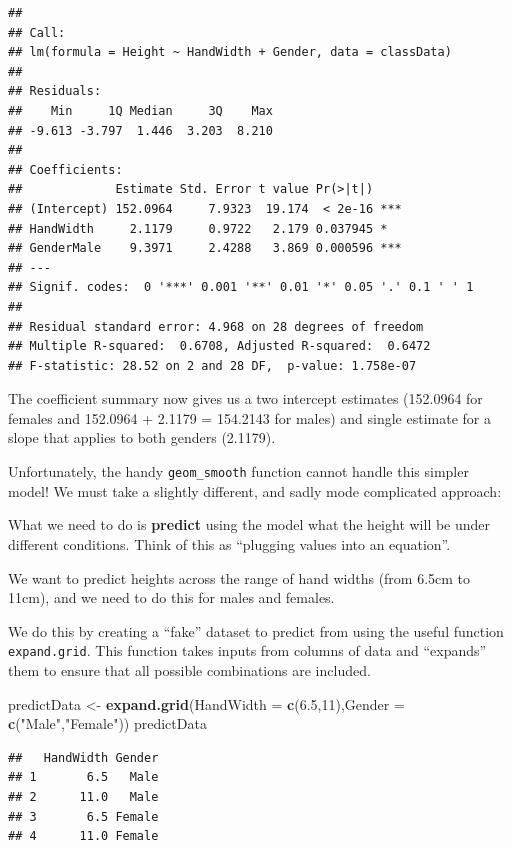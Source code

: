 \documentclass[
  a4paperpaper,
]{book}
\newenvironment{Shaded}{\begin{snugshade}}{\end{snugshade}}
\newcommand{\DataTypeTok}[1]{\textcolor[rgb]{0.13,0.29,0.53}{#1}}
\newcommand{\DecValTok}[1]{\textcolor[rgb]{0.00,0.00,0.81}{#1}}
\newcommand{\FloatTok}[1]{\textcolor[rgb]{0.00,0.00,0.81}{#1}}
\newcommand{\KeywordTok}[1]{\textcolor[rgb]{0.13,0.29,0.53}{\textbf{#1}}}
\newcommand{\NormalTok}[1]{#1}
\newcommand{\StringTok}[1]{\textcolor[rgb]{0.31,0.60,0.02}{#1}}
\begin{document}
\begin{verbatim}
## 
## Call:
## lm(formula = Height ~ HandWidth + Gender, data = classData)
## 
## Residuals:
##    Min     1Q Median     3Q    Max 
## -9.613 -3.797  1.446  3.203  8.210 
## 
## Coefficients:
##             Estimate Std. Error t value Pr(>|t|)    
## (Intercept) 152.0964     7.9323  19.174  < 2e-16 ***
## HandWidth     2.1179     0.9722   2.179 0.037945 *  
## GenderMale    9.3971     2.4288   3.869 0.000596 ***
## ---
## Signif. codes:  0 '***' 0.001 '**' 0.01 '*' 0.05 '.' 0.1 ' ' 1
## 
## Residual standard error: 4.968 on 28 degrees of freedom
## Multiple R-squared:  0.6708,	Adjusted R-squared:  0.6472 
## F-statistic: 28.52 on 2 and 28 DF,  p-value: 1.758e-07
\end{verbatim}

The coefficient summary now gives us a two intercept estimates (152.0964 for females and 152.0964 + 2.1179 = 154.2143 for males) and single estimate for a slope that applies to both genders (2.1179).

Unfortunately, the handy \texttt{geom\_smooth} function cannot handle this simpler model! We must take a slightly different, and sadly mode complicated approach:

What we need to do is \textbf{predict} using the model what the height will be under different conditions. Think of this as ``plugging values into an equation''.

We want to predict heights across the range of hand widths (from 6.5cm to 11cm), and we need to do this for males and females.

We do this by creating a ``fake'' dataset to predict from using the useful function \texttt{expand.grid}. This function takes inputs from columns of data and ``expands'' them to ensure that all possible combinations are included.

\begin{Shaded}
\begin{Highlighting}[]
\NormalTok{predictData \textless{}{-}}\StringTok{ }\KeywordTok{expand.grid}\NormalTok{(}\DataTypeTok{HandWidth =} \KeywordTok{c}\NormalTok{(}\FloatTok{6.5}\NormalTok{,}\DecValTok{11}\NormalTok{),}\DataTypeTok{Gender =} \KeywordTok{c}\NormalTok{(}\StringTok{"Male"}\NormalTok{,}\StringTok{"Female"}\NormalTok{))}
\NormalTok{predictData}
\end{Highlighting}
\end{Shaded}

\begin{verbatim}
##   HandWidth Gender
## 1       6.5   Male
## 2      11.0   Male
## 3       6.5 Female
## 4      11.0 Female
\end{verbatim}
\end{document}
